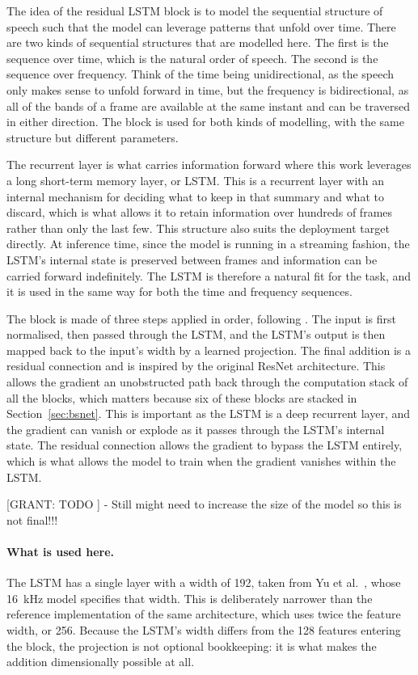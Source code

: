 The idea of the residual LSTM block is to model the sequential structure of speech such that the model can leverage patterns that unfold over time. There are two kinds of sequential structures that are modelled here. The first is the sequence over time, which is the natural order of speech. The second is the sequence over frequency. Think of the time being unidirectional, as the speech only makes sense to unfold forward in time, but the frequency is bidirectional, as all of the bands of a frame are available at the same instant and can be traversed in either direction. The block is used for both kinds of modelling, with the same structure but different parameters.

The recurrent layer is what carries information forward where this work leverages a long short-term memory
layer, or LSTM. This is a recurrent layer with an internal mechanism for deciding what to keep in that summary and what to discard, which is what allows it to retain information over hundreds of frames rather than only the last few. This structure also suits the deployment target directly. At inference time, since the model is running in a streaming fashion, the LSTM's internal state is preserved between frames and information can be carried forward indefinitely. The LSTM is therefore a natural fit for the task, and it is used in the same way for both the time and frequency sequences.

The block is made of three steps applied in order, following \cite{luo2023music}. The input is first normalised, then passed through the LSTM, and the LSTM's output is then mapped back to the input's width by a learned projection. The final addition is a residual connection and is inspired by the original ResNet \cite{he2016deep} architecture. This allows the gradient an unobstructed path back through the computation stack of all the blocks, which matters because six of these blocks are stacked in Section~\ref{sec:bsnet}. This is important as the LSTM is a deep recurrent layer, and the gradient can vanish or explode as it passes through the LSTM's internal state. The residual connection allows the gradient to bypass the LSTM entirely, which is what allows the model to train when the gradient vanishes within the LSTM. 


[GRANT: TODO ] - Still might need to increase the size of the model so this is not final!!!

\paragraph{What is used here.}
The LSTM has a single layer with a width of 192, taken from Yu et al.\ \cite{yu2023high}, whose \SI{16}{\kHz} model specifies that width. This is deliberately narrower than the reference implementation of the same architecture,
which uses twice the feature width, or 256. Because the LSTM's width differs from
the 128 features entering the block, the projection is not optional bookkeeping: it
is what makes the addition dimensionally possible at all.

